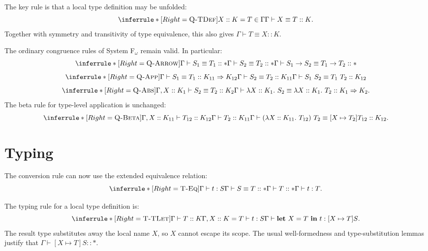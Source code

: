 \documentclass[nonacm]{acmart}
\begin{document}
The key rule is that a local type definition may be unfolded:
\[
\inferrule*[Right=\textsc{Q-TDef}]
  {
    X :: K = T \in \Gamma
  }
  {
    \Gamma \vdash X \equiv T :: K
  }.
\]
Together with symmetry and transitivity of type equivalence, this also gives
$\Gamma \vdash T \equiv X :: K$.

The ordinary congruence rules of System F$_\omega$ remain valid.  In particular:
\[
\inferrule*[Right=\textsc{Q-Arrow}]
  {
    \Gamma \vdash S_1 \equiv T_1 :: *
    \\
    \Gamma \vdash S_2 \equiv T_2 :: *
  }
  {
    \Gamma \vdash S_1 \to S_2 \equiv T_1 \to T_2 :: *
  }
\]
\[
\inferrule*[Right=\textsc{Q-App}]
  {
    \Gamma \vdash S_1 \equiv T_1 :: K_{11} \Rightarrow K_{12}
    \\
    \Gamma \vdash S_2 \equiv T_2 :: K_{11}
  }
  {
    \Gamma \vdash S_1\ S_2 \equiv T_1\ T_2 :: K_{12}
  }
\]
\[
\inferrule*[Right=\textsc{Q-Abs}]
  {
    \Gamma, X :: K_1 \vdash S_2 \equiv T_2 :: K_2
  }
  {
    \Gamma \vdash
    \lambda X :: K_1.\ S_2
    \equiv
    \lambda X :: K_1.\ T_2
    :: K_1 \Rightarrow K_2
  }.
\]
The beta rule for type-level application is unchanged:
\[
\inferrule*[Right=\textsc{Q-Beta}]
  {
    \Gamma, X :: K_{11} \vdash T_{12} :: K_{12}
    \\
    \Gamma \vdash T_2 :: K_{11}
  }
  {
    \Gamma \vdash
    (\lambda X :: K_{11}.\ T_{12})\ T_2
    \equiv
    [X \mapsto T_2]T_{12}
    :: K_{12}
  }.
\]

\section{Typing}

The conversion rule can now use the extended equivalence relation:
\[
\inferrule*[Right=\textsc{T-Eq}]
  {
    \Gamma \vdash t : S
    \\
    \Gamma \vdash S \equiv T :: *
    \\
    \Gamma \vdash T :: *
  }
  {
    \Gamma \vdash t : T
  }.
\]

The typing rule for a local type definition is:
\[
\inferrule*[Right=\textsc{T-TLet}]
  {
    \Gamma \vdash T :: K
    \\
    \Gamma, X :: K = T \vdash t : S
  }
  {
    \Gamma \vdash
    \mathbf{let}\ X = T\ \mathbf{in}\ t
    :
    [X \mapsto T]S
  }.
\]
The result type substitutes away the local name $X$, so $X$ cannot escape its scope.
The usual well-formedness and type-substitution lemmas justify that
$\Gamma \vdash [X \mapsto T]S :: *$.
\end{document}
